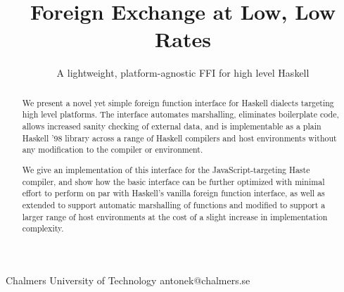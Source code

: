 \documentclass{sigplanconf}
\begin{document}
\setlength{\pdfpageheight}{\paperheight}
\setlength{\pdfpagewidth}{\paperwidth}

\exclusivelicense
{} 





\title{Foreign Exchange at Low, Low Rates}
\subtitle{A lightweight, platform-agnostic FFI for high level Haskell}

           {Chalmers University of Technology}
           {antonek@chalmers.se}

\maketitle

\begin{abstract}
  We present a novel yet simple foreign function interface for Haskell dialects
  targeting high level platforms. The interface automates marshalling,
  eliminates boilerplate code, allows increased sanity checking of external
  data, and is implementable as a plain Haskell '98 library across a range of
  Haskell compilers and host environments without any modification to the
  compiler or environment.
  
  We give an implementation of this interface for the JavaScript-targeting
  Haste compiler, and show how the basic interface can be
  further optimized with minimal effort to perform on par with Haskell's
  vanilla foreign function interface, as well as extended to support automatic
  marshalling of functions and modified to support a larger range of host
  environments at the cost of a slight increase in implementation complexity.
\end{abstract}

\end{document}
